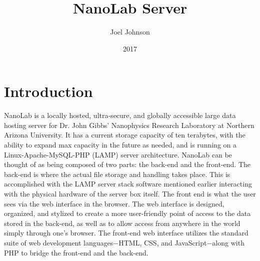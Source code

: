 \documentclass[titlepage]{article}
\title{NanoLab Server}
\author{Joel Johnson }
\date{2017}
\begin{document}
\maketitle

\tableofcontents
\newpage\listoffigures

\newpage\section{Introduction}

    NanoLab is a locally hosted, ultra-secure, and globally accessible large data hosting server for Dr. John Gibbs' Nanophysics Research Laboratory at Northern Arizona University. It has a current storage capacity of ten terabytes, with the ability to expand max capacity in the future as needed, and is running on a Linux-Apache-MySQL-PHP (LAMP) server architecture. NanoLab can be thought of as being composed of two parts: the back-end and the front-end. The back-end is where the actual file storage and handling takes place. This is accomplished with the LAMP server stack software mentioned earlier interacting with the physical hardware of the server box itself. The front end is what the user sees via the web interface in the browser. The web interface is designed, organized, and stylized to create a more user-friendly point of access to the data stored in the back-end, as well as to allow access from anywhere in the world simply through one's browser. The front-end web interface utilizes the standard suite of web development languages$-$HTML, CSS, and JavaScript$-$along with PHP to bridge the front-end and the back-end.
    
\end{document}
